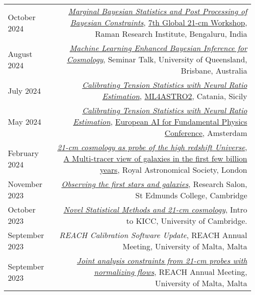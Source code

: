 \documentclass{article}
\begin{document}
\begin{tabular}{L!{\vrule}R}
    October 2024 & \textit{\href{https://github.com/htjb/Talks/raw/master/Talks/7th-Global-Workshop/margarine.pdf}{Marginal Bayesian Statistics and Post Processing of Bayesian Constraints}}, \href{https://sites.google.com/view/global-21-cm-workshop}{7th Global 21-cm Workshop}, Raman Research Institute, Bengaluru, India \\
    August 2024 & \textit{\href{https://github.com/htjb/Talks/tree/master/Talks/brisbane_davis_group_meeting_2024}{Machine Learning Enhanced Bayesian Inference for Cosmology}}, Seminar Talk, University of Queensland, Brisbane, Australia \\
    July 2024 & \textit{\href{https://github.com/htjb/Talks/raw/master/Talks/ML4ASTRO-Tensionnets/tensions.pdf}{Calibrating Tension Statistics with Neural Ratio Estimation}}, \href{https://indico.ict.inaf.it/event/2690/}{ML4ASTRO2}, Catania, Sicily \\
    May 2024 & \textit{\href{https://github.com/htjb/Talks/raw/master/Talks/Amsterdam-EuCAIF-2024/tensions.pdf}{Calibrating Tension Statistics with Neural Ratio Estimation}}, \href{https://indico.nikhef.nl/event/4875/}{European AI for Fundamental Physics Conference}, Amsterdam \\
    February 2024 & \textit{\href{https://github.com/htjb/Talks/raw/master/Talks/RAS_Multi-tracer_View/21cmCosmo.pdf}{21-cm cosmology as probe of the high redshift Universe}}, \href{https://ras.ac.uk/events-and-meetings/ras-meetings/multi-tracer-view-galaxies-first-few-billion-years}{A Multi-tracer view of galaxies in the first few billion years}, Royal Astronomical Society, London \\
    November 2023 & \textit{\href{https://github.com/htjb/Talks/raw/master/Talks/St_Edmunds_Research_Salon_Nov_2023/research_salon.pdf}{Observing the first stars and galaxies}}, Research Salon, St Edmunds College, Cambridge \\
    October 2023 & \textit{\href{https://github.com/htjb/Talks/raw/master/Talks/KICC_Intro_23/kicc_intro_23.pdf}{Novel Statistical Methods and 21-cm cosmology}}, Intro to KICC, University of Cambridge. \\
    September 2023 & \textit{REACH Calibration Software Update}, REACH Annual Meeting, University of Malta, Malta \\
    September 2023 & \textit{\href{https://github.com/htjb/Talks/tree/master/Talks/REACH_Malta/joint_analysis_margarine.pdf}{Joint analysis constraints from 21-cm probes with normalizing flows}}, REACH Annual Meeting, University of Malta, Malta \\

\end{tabular}
\end{document}
